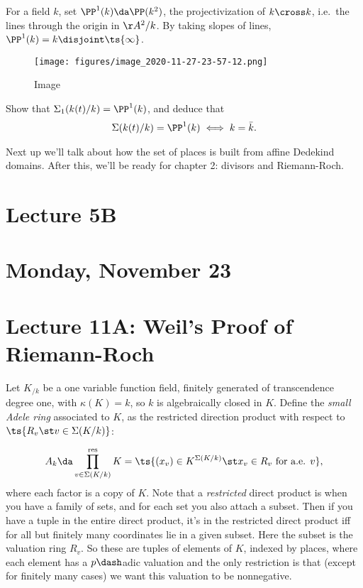\begin{exercise}[?]

For a field \(k\), set \(\PP^1(k) \da \PP(k^2)\), the projectivization
of \(k\cross k\), i.e.~the lines through the origin in \(\AA^2/k\). By
taking slopes of lines, \(\PP^1(k) = k \disjoint \ts{\infty}\).

\begin{figure}
\centering
\texttt{[image: figures/image\_2020-11-27-23-57-12.png]}
\caption{Image}
\end{figure}

Show that \(\Sigma_1(k(t)/k) = \PP^1(k)\), and deduce that
\begin{align*}  
\Sigma(k(t)/k) = \PP^1(k) \iff k = \bar k
.\end{align*}

\end{exercise}

Next up we'll talk about how the set of places is built from affine
Dedekind domains. After this, we'll be ready for chapter 2: divisors and
Riemann-Roch.

\hypertarget{lecture-5b}{%
\section{Lecture 5B}\label{lecture-5b}}

\hypertarget{monday-november-23}{%
\section{Monday, November 23}\label{monday-november-23}}

\hypertarget{lecture-11a-weils-proof-of-riemann-roch}{%
\section{Lecture 11A: Weil's Proof of
Riemann-Roch}\label{lecture-11a-weils-proof-of-riemann-roch}}

Let \(K_{/k}\) be a one variable function field, finitely generated of
transcendence degree one, with \(\kappa(K) = k\), so \(k\) is
algebraically closed in \(K\). Define the \emph{small Adele ring}
associated to \(K\), as the restricted direction product with respect to
\(\ts{R_v \st v\in \Sigma(K/k)}\):

\begin{align*}
A_k \da \prod^{\text{res}}_{v\in \Sigma(K/k)} K
= \ts{(x_v) \in K^{\Sigma(K/k)} \st x_v \in R_v \text{ for a.e. } v }
,\end{align*} where each factor is a copy of \(K\). Note that a
\emph{restricted} direct product is when you have a family of sets, and
for each set you also attach a subset. Then if you have a tuple in the
entire direct product, it's in the restricted direct product iff for all
but finitely many coordinates lie in a given subset. Here the subset is
the valuation ring \(R_v\). So these are tuples of elements of \(K\),
indexed by places, where each element has a \(p\dash\)adic valuation and
the only restriction is that (except for finitely many cases) we want
this valuation to be nonnegative.

